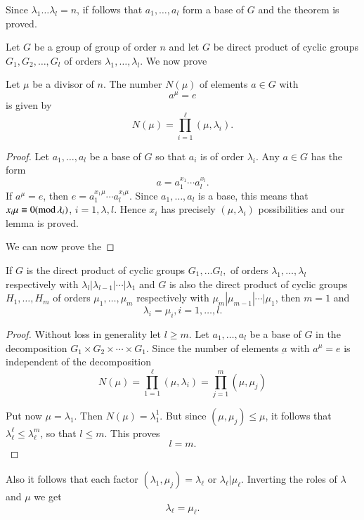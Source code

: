 Since $\lambda_1 \ldots \lambda_l = n $, if follows that $a_1
,\ldots,a_l$ form a base of $G$ and the theorem is proved.  

Let $G$ be a group of group of order $n$ and let $G$ be direct product
of cyclic groups $G_1 , G_2 ,\ldots, G_l$ of orders $\lambda_1 ,\ldots,
\lambda_l$. We now prove 

\begin{lem}%
Let $\mu$ be a divisor of $n$. The number $N(\mu)$ of elements $a
  \in G$ with 
$$
a^\mu = e
$$
is given by
$$
N(\mu) =\prod^\ell_{i=1} (\mu , \lambda_i).
$$
\end{lem}

\begin{proof}
Let $a_1 ,\ldots, a_l$ be a base of $G$ so that $a_i$ is of order
$\lambda_i$. Any $a \in G$ has the form 
$$
a = a_1^{x_1} \cdots a_l^{x_l}. 
$$
If $a^\mu = e$, then $e =a_1^{x_1 \mu} \cdots a_l^{x_l \mu}$. Since
$a_1 ,\ldots, a_l$ is a base, this means that $x_i \mu \equiv 0 ({\rm
  mod} \,\lambda_i)$, $i = 1 ,\lambda,l$. Hence $x_i$ has precisely $(\mu,
\lambda_i)$ possibilities and our lemma is proved.  

We can now prove the 
\end{proof}

\begin{thm}\label{app:thm2}%
If $G$ is the direct product of cyclic groups $G_1 ,\ldots G_l,$ of
orders $\lambda_1 ,\ldots, \lambda_l$ respectively with $\lambda_l |
\lambda_{l-1}|\cdots|\lambda_1$ and $G$ is also the direct product of
cyclic groups $H_1 ,\ldots,H_m$ of orders $\mu_1 ,\ldots, \mu _m$
respectively with $\mu_m | \mu_{m-1} |\cdots| \mu_1$,\pageoriginale
then $m=1$ and  
$$
\lambda_i = \mu_i, i =1 ,\ldots,l.
$$
\end{thm}

\begin{proof}
Without loss in generality let $l \ge m$. Let $a_1 ,\ldots,a_l$ be a
base of $G$ in the decomposition $G_1 \times  G_2 \times \cdots
\times  G_1$. Since the number of elements $\underbar{a}$ with $a^\mu
=e$ is independent of the decomposition  
$$
N(\mu) = \prod_{1=1}^\ell (\mu , \lambda_i) = \prod_{j=1}^m (\mu,
\mu_j) 
$$

Put now $\mu = \lambda_1$. Then $ N(\mu) = \lambda^1_1$. But since
$(\mu, \mu_j) \le \mu$, it follows that $\lambda_\ell^\ell \le
\lambda^m_\ell$, so that $l \le m$. This proves 
$$
l=m.
$$
\end{proof}

Also it follows that each factor $(\lambda_1, \mu_j) = \lambda_\ell$ 
 or $\lambda_\ell | \mu_\ell$. Inverting the roles of $\lambda$ and
 $\mu$ we get  
$$
\lambda_\ell = \mu_\ell .
$$

